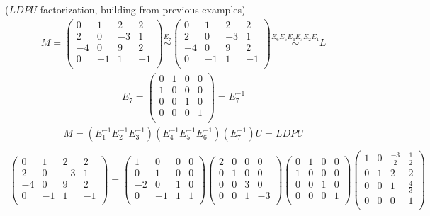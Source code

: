 \begin{example} ($LDPU$ factorization, building from previous examples)
\begin{eqnarray*}
M=
\begin{pmatrix}
0&1&2&2\\
2&0&-3&1\\
-4&0&9&2\\
0&-1&1&-1\\
\end{pmatrix}
\stackrel{E_7}{\sim}
\begin{pmatrix}
0&1&2&2\\
2&0&-3&1\\
-4&0&9&2\\
0&-1&1&-1\\
\end{pmatrix}
\stackrel{E_6E_5E_4E_3E_2E_1}{\sim} L
\end{eqnarray*}
\begin{eqnarray*}
E_7=
\begin{pmatrix}
0&1&0&0\\
1&0&0&0\\
0&0&1&0\\
0&0&0&1\\
\end{pmatrix}
=E_7^{-1}
\end{eqnarray*}
\begin{eqnarray*}
M=(E_1^{-1}E_2^{-1}E_3^{-1})(E_4^{-1}E_5^{-1}E_6^{-1}) (E_7^{-1}) U=LDPU\\
\end{eqnarray*}
\begin{eqnarray*}
\!\!\!\begin{pmatrix}
0&1&2&2\\
2&0&-3&1\\
-4&0&9&2\\
0&-1&1&-1\\
\end{pmatrix}
\!\!\!=\!\!\!
\begin{pmatrix}
1&0&0&0\\
0&1&0&0\\
-2&0&1&0\\
0&-1&1&1\\
\end{pmatrix} 
\!\!\!
\begin{pmatrix}
2&0&0&0\\
0&1&0&0\\
0&0&3&0\\
0&0&1&-3\\
\end{pmatrix} 
\!\!\!
\begin{pmatrix}
0&1&0&0\\
1&0&0&0\\
0&0&1&0\\
0&0&0&1\\
\end{pmatrix}
\!\!\!
\begin{pmatrix}
1&0&\frac{-3}{2}&\frac{1}{2}\\
0&1&2&2\\
0&0&1&\frac43\\
0&0&0&1\\
\end{pmatrix}
\end{eqnarray*}


\end{example}

